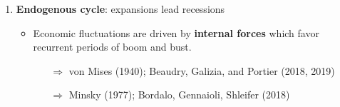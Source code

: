 \documentclass[hyperref={pdfpagelabels=false}]{beamer}
\begin{document}
{\begin{enumerate}
		\item \textbf{Endogenous cycle}: expansions lead recessions
		\begin{itemize}
			\item Economic fluctuations are driven by \textbf{internal forces} which favor recurrent periods of boom and bust. 
			\begin{itemize}
				\item[$\Rightarrow$] von Mises (1940); Beaudry, Galizia, and Portier (2018, 2019) %
				\item[$\Rightarrow$] Minsky (1977); Bordalo, Gennaioli, Shleifer (2018) %
			\end{itemize}
			\end{itemize}
		
		

\end{enumerate}}
\end{document}
